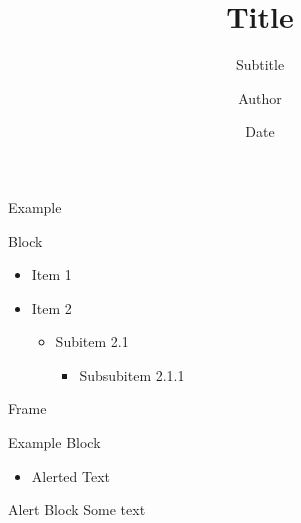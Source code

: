 \documentclass[10pt,xcolor={usenames,dvipsnames}]{beamer}
\begin{document}
\title[short title]{Title}
\subtitle{Subtitle}

\author{Author} 
\date{Date} 

\frame{\titlepage}

\begin{frame}{Example}
	\begin{block}{Block}
		\begin{itemize}
			\item Item 1
			\item Item 2
			\begin{itemize}
				\item Subitem 2.1
				\begin{itemize}
					\item Subsubitem 2.1.1
				\end{itemize}
			\end{itemize}		
		\end{itemize}
	\end{block}
\end{frame}

\begin{frame}{Frame}
	\begin{exampleblock}{Example Block}
		\begin{itemize}
			\item \alert{Alerted Text}
		\end{itemize}
	\end{exampleblock}
	\begin{alertblock}{Alert Block}
		Some text
	\end{alertblock}
\end{frame}
\end{document}
